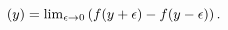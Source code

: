 \begin{equation}
[f](y) = {\rm lim}_{\epsilon \rightarrow 0} 
\left( f(y+\epsilon) - f(y-\epsilon)\right).
\end{equation}

